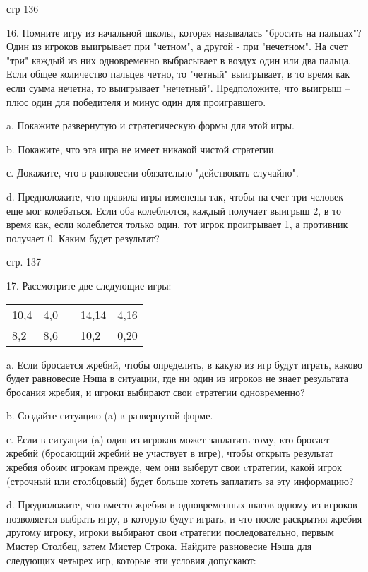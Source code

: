 \documentclass[a4paper,12pt]{article}
\begin{document}
стр 136

16. Помните игру из начальной школы, которая
называлась "бросить на пальцах"? Один из игроков
выигрывает при "четном", а другой - при "нечетном".
На счет "три" каждый из них одновременно
выбрасывает в воздух один или два пальца. Если
общее количество пальцев четно, то "четный"
выигрывает, в то время как если сумма нечетна, то
выигрывает "нечетный". Предположите, что выигрыш --
плюс один для победителя и минус один для
проигравшего.

a. Покажите развернутую и стратегическую формы для
этой игры.

b. Покажите, что эта игра не имеет никакой чистой
стратегии.

с. Докажите, что в равновесии обязательно
"действовать случайно".

d. Предположите, что правила игры изменены так,
чтобы на счет три человек еще мог колебаться. Если
оба колеблются, каждый получает выигрыш 2, в то
время как, если колеблется только один, тот игрок
проигрывает 1, а противник получает 0. Каким будет
результат?

стр. 137

17. Рассмотрите две следующие игры:

\begin{tabular}{|l|l|l|l|l|}
\cline{1-2}\cline{4-5} 10,4 & 4,0 &  & 14,14 & 4,16
\\ \cline{1-2}\cline{4-5} 8,2 & 8,6 &  & 10,2 &
0,20 \\ \cline{1-2}\cline{4-5}
\end{tabular}

a. Если бросается жребий, чтобы определить, в какую
из игр будут играть, каково будет равновесие Нэша в
ситуации, где ни один из игроков не знает
результата бросания жребия, и игроки выбирают свои
cтратегии одновременно?

b. Создайте ситуацию (a) в развернутой форме.

с. Если в ситуации (a) один из игроков может
заплатить тому, кто бросает жребий (бросающий
жребий не участвует в игре), чтобы открыть
результат жребия обоим игрокам прежде, чем они
выберут свои cтратегии, какой игрок (строчный или
столбцовый) будет больше хотеть заплатить за эту
информацию?

d. Предположите, что вместо жребия и одновременных
шагов одному из игроков позволяется выбрать игру, в
которую будут играть, и что после раскрытия жребия
другому игроку, игроки выбирают свои cтратегии
последовательно, первым Мистер Столбец, затем
Мистер Строка. Найдите равновесие Нэша для
следующих четырех игр, которые эти условия
допускают:
\end{document}
